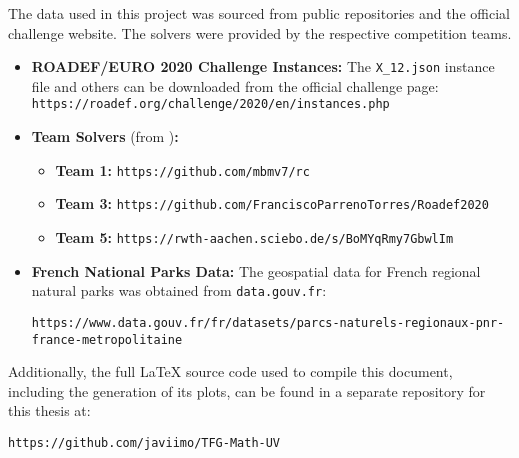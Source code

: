 The data used in this project was sourced from public repositories and the official challenge website. The solvers were provided by the respective competition teams.
\begin{itemize}
    \item \textbf{ROADEF/EURO 2020 Challenge Instances:} The \texttt{X\_12.json} instance file and others can be downloaded from the official challenge page: \\ \texttt{https://roadef.org/challenge/2020/en/instances.php}
    \item \textbf{Team Solvers} (from \cite{top1, ConsueloRoadef, top5})\textbf{:}
        \begin{itemize}
            \item \textbf{Team 1:} \texttt{https://github.com/mbmv7/rc}
            \item \textbf{Team 3:} \texttt{https://github.com/FranciscoParrenoTorres/Roadef2020}
            \item \textbf{Team 5:} \texttt{https://rwth-aachen.sciebo.de/s/BoMYqRmy7GbwlIm}
        \end{itemize}
    \item \textbf{French National Parks Data:} The geospatial data for French regional natural parks was obtained from \texttt{data.gouv.fr}: 
    \begin{adjustwidth}{-1.5cm}{0cm}
    \texttt{https://www.data.gouv.fr/fr/datasets/parcs-naturels-regionaux-pnr-france-metropolitaine}
    \end{adjustwidth}

\end{itemize}

Additionally, the full LaTeX source code used to compile this document, including the generation of its plots, can be found in a separate repository for this thesis at:
\begin{center}
    \texttt{https://github.com/javiimo/TFG-Math-UV}
\end{center}
